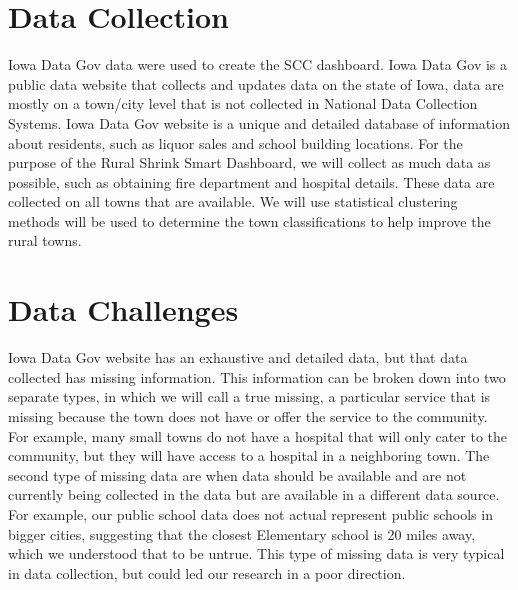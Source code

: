 \documentclass[10pt]{article}
\begin{document}
\section{Data Collection}
Iowa Data Gov data were used to create the SCC dashboard. Iowa Data Gov is a public data website that collects and updates data on the state of Iowa, data are mostly on a town/city level that is not collected in National Data Collection Systems. Iowa Data Gov website is a unique and detailed database of information about residents, such as liquor sales and school building locations. For the purpose of the Rural Shrink Smart Dashboard, we will collect as much data as possible, such as obtaining fire department and hospital details. These data are collected on all towns that are available. We will use statistical clustering methods will be used to determine the town classifications to help improve the rural towns.

\section{Data Challenges}
Iowa Data Gov website has an exhaustive and detailed data, but that data collected has missing information. This information can be broken down into two separate types, in which we will call a true missing, a particular service that is missing because the town does not have or offer the service to the community. For example, many small towns do not have a hospital that will only cater to the community, but they will have access to a hospital in a neighboring town. The second type of missing data are when data should be available and are not currently being collected in the data but are available in a different data source. For example, our public school data does not actual represent public schools in bigger cities, suggesting that the closest Elementary school is 20 miles away, which we understood that to be untrue. This type of missing data is very typical in data collection, but could led our research in a poor direction.
\end{document}
